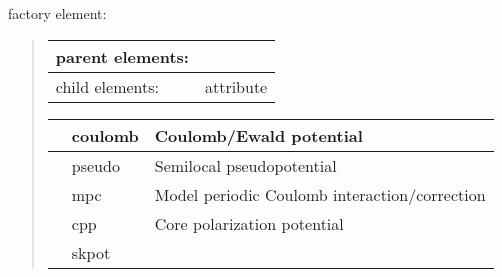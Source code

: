 \documentclass[letterpaper,10pt,english]{sphinxmanual}
\begin{document}
 factory element:
\begin{quote}


\begin{savenotes}\sphinxattablestart
\centering
\begin{tabulary}{\linewidth}[t]{|T|T|}
\hline

parent elements:
&
\\
\hline
child elements:
&
 attribute
\\
\hline
\end{tabulary}
\par
\sphinxattableend\end{savenotes}


\begin{savenotes}\sphinxattablestart
\centering
\begin{tabulary}{\linewidth}[t]{|T|T|T|}
\hline

&
coulomb
&
Coulomb/Ewald potential
\\
\hline&
pseudo
&
Semilocal pseudopotential
\\
\hline&
mpc
&
Model periodic Coulomb interaction/correction
\\
\hline&
cpp
&
Core polarization potential
\\
\hline&
skpot
&
\\
\hline
\end{tabulary}
\par
\sphinxattableend\end{savenotes}
\end{quote}
\end{document}
